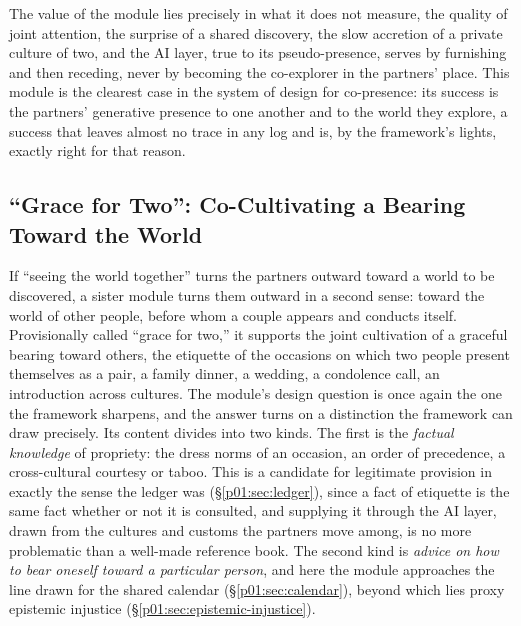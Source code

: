 \documentclass[11pt,a4paper]{article}
\begin{document}
The value of the module lies precisely in what it does not measure, the quality of joint attention, the surprise of a shared discovery, the slow accretion of a private culture of two, and the AI layer, true to its pseudo-presence, serves by furnishing and then receding, never by becoming the co-explorer in the partners' place. This module is the clearest case in the system of design for co-presence: its success is the partners' generative presence to one another and to the world they explore, a success that leaves almost no trace in any log and is, by the framework's lights, exactly right for that reason.

\subsection{``Grace for Two'': Co-Cultivating a Bearing Toward the World}\label{p01:sec:gracefortwo}

If ``seeing the world together'' turns the partners outward toward a world to be discovered, a sister module turns them outward in a second sense: toward the world of other people, before whom a couple appears and conducts itself. Provisionally called ``grace for two,'' it supports the joint cultivation of a graceful bearing toward others, the etiquette of the occasions on which two people present themselves as a pair, a family dinner, a wedding, a condolence call, an introduction across cultures. The module's design question is once again the one the framework sharpens, and the answer turns on a distinction the framework can draw precisely. Its content divides into two kinds. The first is the \emph{factual knowledge} of propriety: the dress norms of an occasion, an order of precedence, a cross-cultural courtesy or taboo. This is a candidate for legitimate provision in exactly the sense the ledger was (§\ref{p01:sec:ledger}), since a fact of etiquette is the same fact whether or not it is consulted, and supplying it through the AI layer, drawn from the cultures and customs the partners move among, is no more problematic than a well-made reference book. The second kind is \emph{advice on how to bear oneself toward a particular person}, and here the module approaches the line drawn for the shared calendar (§\ref{p01:sec:calendar}), beyond which lies proxy epistemic injustice (§\ref{p01:sec:epistemic-injustice}).
\end{document}
